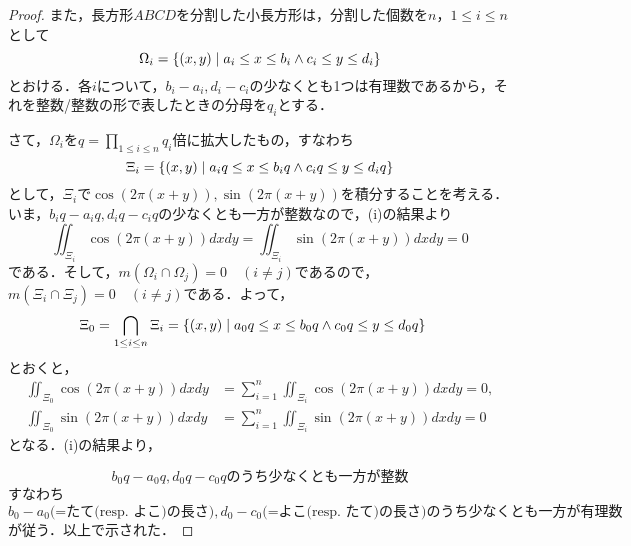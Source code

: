 \begin{enumerate}[(1)]
\begin{enumerate}[(i)]
\begin{proof}
            また，長方形$ABCD$を分割した小長方形は，分割した個数を$n$，$1\le i \le n$として
            \begin{equation}
                \Omega_i=\qty{(x,y)\mathrel{}\middle|\mathrel{}a_i\le x \le b_i\land c_i \le y \le d_i} 
            \end{equation}
            とおける．各$i$について，$b_i-a_i, d_i-c_i$の少なくとも1つは有理数であるから，それを整数/整数の形で表したときの分母を$q_i$とする．
            
            さて，$\Omega_i$を$\displaystyle q=\prod_{1\le i \le n} q_i$倍に拡大したもの，すなわち
            \begin{equation}
                \Xi_i = \qty{(x,y)\mathrel{}\middle|\mathrel{}a_iq\le x \le b_iq\land c_iq \le y \le d_iq} 
            \end{equation}
            として，$\Xi_i$で$\cos(2\pi(x+y)),\sin(2\pi(x+y))$を積分することを考える．いま，$b_iq - a_iq, d_iq - c_iq$の少なくとも一方が整数なので，(i)の結果より
            \begin{equation}
                \iint_{\Xi_i} \cos(2\pi(x+y))dxdy
                =\iint_{\Xi_i} \sin(2\pi(x+y))dxdy
                =0
            \end{equation}
            である．そして，$m(\Omega_i \cap \Omega_j) =0 \quad (i\ne j)$であるので，$m(\Xi_i \cap \Xi_j) =0 \quad (i\ne j)$である．よって，
            \begin{align}
                \Xi_0 
                &= \bigcap_{1\le i \le n} \Xi_i
                = \qty{(x,y)\mathrel{}\middle|\mathrel{}a_0q\le x \le b_0q\land c_0q \le y \le d_0q} 
            \end{align}
            とおくと，
            \begin{align}
                \iint_{\Xi_0} \cos(2\pi(x+y))dxdy
                &=\sum_{i=1}^n \iint_{\Xi_i} \cos(2\pi(x+y))dxdy
                =0,\\
                \iint_{\Xi_0} \sin(2\pi(x+y))dxdy
                &=\sum_{i=1}^n \iint_{\Xi_i} \sin(2\pi(x+y))dxdy
                =0
            \end{align}
            となる．(i)の結果より，
            
            \begin{equation}
                b_0q - a_0q, d_0q - c_0q\text{のうち少なくとも一方が整数}
            \end{equation}
            すなわち
            \begin{equation}
                b_0 - a_0\text{(=たて(resp. よこ)の長さ)}, d_0 - c_0\text{(=よこ(resp. たて)の長さ)}\text{のうち少なくとも一方が有理数}
            \end{equation}
            が従う．以上で示された．
        \end{proof}

    \end{enumerate}
    
\end{enumerate}

